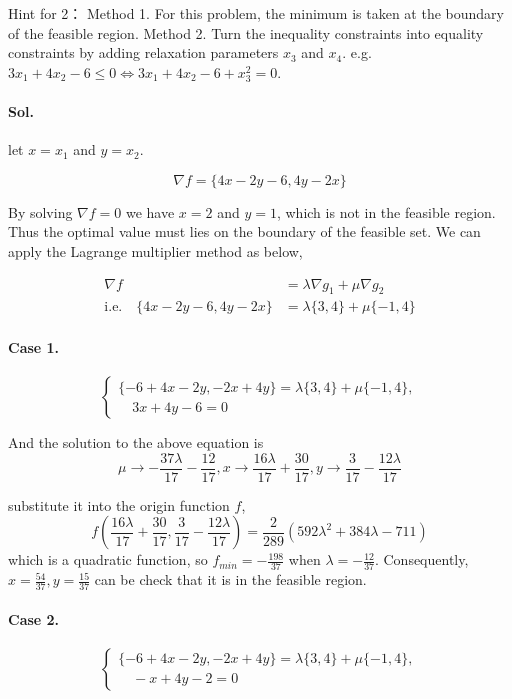 \documentclass[11pt]{article}
\begin{document}
Hint for 2：
Method 1. For this problem, the minimum is taken at the boundary of the feasible region. Method 2. Turn the inequality constraints into equality constraints by adding relaxation parameters $x_{3}$ and $x_{4}$. e.g. $3 x_{1}+4 x_{2}-6 \leq 0 \Leftrightarrow 3 x_{1}+4 x_{2}-6+x_{3}^{2}=0$.


\paragraph{Sol.} let $x = x_1 $ and $ y  = x_2$.

$$
\nabla f = \{4 x-2 y-6,4 y-2 x\}
$$

By solving $\nabla f = 0$ we have $x = 2 $ and $ y = 1$, which is not in the feasible region. Thus the optimal value must lies on the boundary of the feasible set.
We can apply the Lagrange multiplier method as below,

$$
\begin{aligned}
\nabla f &= \lambda \nabla g_1  + \mu \nabla g_2	\\
\text{i.e.}\quad  \{4 x-2 y-6,4 y-2 x\} & = \lambda \{3,4\} + \mu \{-1,4\}
\end{aligned}
$$

\paragraph{Case 1.}
$$
\begin{cases}
	\{-6 + 4 x - 2 y, -2 x + 4 y\}  = \lambda \{3, 4\} + \mu \{-1, 4\},\\\quad 3 x + 4 y - 6 = 0 
\end{cases}
$$

And the solution to the above equation is 
$$
\mu \to -\frac{37 \lambda }{17}-\frac{12}{17},x\to \frac{16 \lambda }{17}+\frac{30}{17},y\to \frac{3}{17}-\frac{12 \lambda }{17}
$$

substitute it into the origin function $f$,
$$
f\left(\frac{16 \lambda }{17}+\frac{30}{17},\frac{3}{17}-\frac{12 \lambda }{17}\right) = \frac{2}{289} \left(592 \lambda ^2+384 \lambda -711\right)
$$
which is a quadratic function, so $f_{min} = -\frac{198}{37}$ when $\lambda = -\frac{12}{37}$. Consequently, $x =  \frac{54}{37},y =  \frac{15}{37}$ can be check that it is in the feasible region.

\paragraph{Case 2.}
$$
\begin{cases}
	\{-6 + 4 x - 2 y, -2 x + 4 y\}  = \lambda \{3, 4\} + \mu \{-1, 4\},\\\quad -x + 4 y - 2 = 0 
\end{cases}
$$
\end{document}
